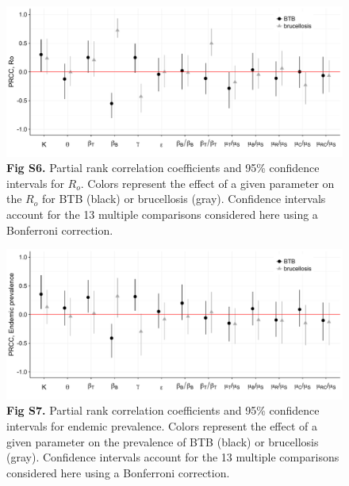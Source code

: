 \documentclass[10pt,letterpaper]{article}
\begin{document}
\begin{figure}
  \centering
  \includegraphics[width = \textwidth]{FigureS6_LHSRo_lowres.pdf}
  \caption*{\textbf{Fig S6.} Partial rank correlation coefficients and 95\% confidence intervals for $R_o$.  Colors represent the effect of a given parameter on the $R_o$ for BTB (black) or brucellosis (gray). Confidence intervals account for the 13 multiple comparisons considered here using a Bonferroni correction.}
\label{fig:figS6}
\end{figure}

\begin{figure}
  \centering
  \includegraphics[width = \textwidth]{FigureS7_LHSPrev_lowres.pdf}
  \caption*{\textbf{Fig S7.} Partial rank correlation coefficients and 95\% confidence intervals for endemic prevalence.  Colors represent the effect of a given parameter on the prevalence of BTB (black) or brucellosis (gray). Confidence intervals account for the 13 multiple comparisons considered here using a Bonferroni correction.}
\label{fig:figS7}
\end{figure}

\pagebreak
\clearpage
\end{document}
